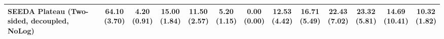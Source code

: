 \begin{table}[H]
{\begin{tabular}{l|cccccc|cccccc}
SEEDA Plateau (Two-sided, decoupled, NoLog) & \bfseries \makecell{64.10 \\ (3.70)} & \makecell{4.20 \\ (0.91)} & {\cellcolor[HTML]{C8E6C9}} \makecell{15.00 \\ (1.84)} & \makecell{11.50 \\ (2.57)} & \makecell{5.20 \\ (1.15)} & \makecell{0.00 \\ (0.00)} & \makecell{12.53 \\ (4.42)} & \makecell{16.71 \\ (5.49)} & {\cellcolor[HTML]{C8E6C9}} \makecell{22.43 \\ (7.02)} & \bfseries \makecell{23.32 \\ (5.81)} & \makecell{14.69 \\ (10.41)} & \makecell{10.32 \\ (1.82)} \\
\bottomrule
\end{tabular}
}%
\end{table}
